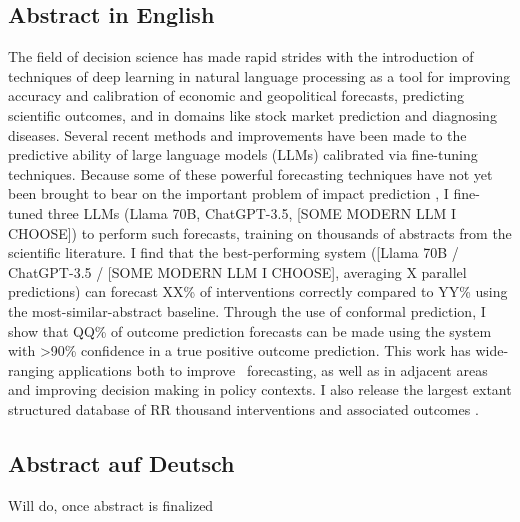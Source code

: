 \documentclass[12pt,a4paper]{article}
\begin{document}
\subsection*{Abstract in English}
The field of decision science has made rapid strides with the introduction of techniques of deep learning in natural language processing as a tool for improving accuracy and calibration of economic and geopolitical forecasts, predicting scientific outcomes, and in domains like stock market prediction and diagnosing diseases. Several recent methods and improvements have been made to the predictive ability of large language models (LLMs) calibrated via fine-tuning techniques. Because some of these powerful forecasting techniques have not yet been brought to bear on the important problem of impact prediction \ABSTRACT, I fine-tuned three LLMs (Llama 70B, ChatGPT-3.5, [SOME MODERN LLM I CHOOSE]) %
to perform such forecasts, training on thousands of abstracts from the scientific literature. I find that the best-performing system ([Llama 70B / ChatGPT-3.5 / [SOME MODERN LLM I CHOOSE], averaging X %
parallel predictions) can forecast XX\% %
of interventions correctly compared to YY\% %
using the most-similar-abstract baseline.
Through the use of conformal prediction, I show that QQ\% %
of outcome prediction forecasts can be made using the system with >90\% confidence in a true positive outcome prediction. This work has wide-ranging applications both to improve \DOMAIN\ forecasting, as well as in adjacent areas and improving decision making in policy contexts. I also release the largest extant structured database of RR thousand %
interventions and associated outcomes \ABSTRACT. 


\subsection*{Abstract auf Deutsch}
Will do, once abstract is finalized %
\clearpage

\setcounter{page}{1}
\tableofcontents
\clearpage

\setcounter{page}{1}
\end{document}
